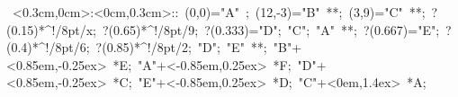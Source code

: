 %

\hbox{
\xy    <0.3cm,0cm>:<0cm,0.3cm>::
       (0,0)="A" ; (12,-3)="B" **\dir{-}; 
       (3,9)="C" **\dir{-}; ?(0.15)*^!/8pt/{x};
       ?(0.65)*^!/8pt/{9}; ?(0.333)="D"; "C"; 
       "A" **\dir{-};  ?(0.667)="E"; 
       ?(0.4)*^!/8pt/{6};  ?(0.85)*^!/8pt/{2};
       "D"; "E" **\dir{-};
       "B"+<0.85em,-0.25ex> *{E};
       "A"+<-0.85em,0.25ex> *{F};
       "D"+<0.85em,-0.25ex> *{C};
       "E"+<-0.85em,0.25ex> *{D};
       "C"+<0em,1.4ex> *{A};
       \endxy}
	   
